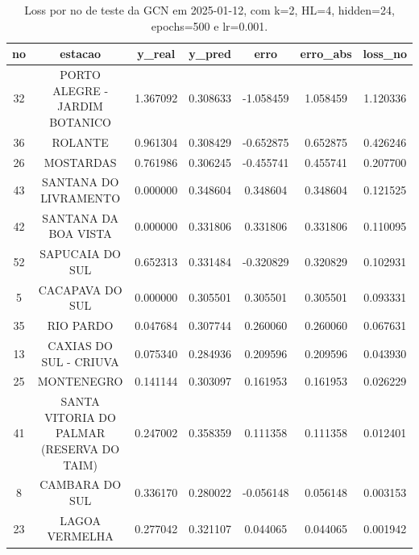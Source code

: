 \begin{table}[h]
\centering
\caption{Loss por no de teste da GCN em 2025-01-12, com k=2, HL=4, hidden=24, epochs=500 e lr=0.001.}
\label{tab:gcn_loss_k2_hl4_h24_e500_d20250112}
\begin{tabular}{ccccccc}
\toprule
no & estacao & y\_real & y\_pred & erro & erro\_abs & loss\_no \\
\midrule
32 & PORTO ALEGRE - JARDIM BOTANICO & 1.367092 & 0.308633 & -1.058459 & 1.058459 & 1.120336 \\
36 & ROLANTE & 0.961304 & 0.308429 & -0.652875 & 0.652875 & 0.426246 \\
26 & MOSTARDAS & 0.761986 & 0.306245 & -0.455741 & 0.455741 & 0.207700 \\
43 & SANTANA DO LIVRAMENTO & 0.000000 & 0.348604 & 0.348604 & 0.348604 & 0.121525 \\
42 & SANTANA DA BOA VISTA & 0.000000 & 0.331806 & 0.331806 & 0.331806 & 0.110095 \\
52 & SAPUCAIA DO SUL & 0.652313 & 0.331484 & -0.320829 & 0.320829 & 0.102931 \\
5 & CACAPAVA DO SUL & 0.000000 & 0.305501 & 0.305501 & 0.305501 & 0.093331 \\
35 & RIO PARDO & 0.047684 & 0.307744 & 0.260060 & 0.260060 & 0.067631 \\
13 & CAXIAS DO SUL - CRIUVA & 0.075340 & 0.284936 & 0.209596 & 0.209596 & 0.043930 \\
25 & MONTENEGRO & 0.141144 & 0.303097 & 0.161953 & 0.161953 & 0.026229 \\
41 & SANTA VITORIA DO PALMAR (RESERVA DO TAIM) & 0.247002 & 0.358359 & 0.111358 & 0.111358 & 0.012401 \\
8 & CAMBARA DO SUL & 0.336170 & 0.280022 & -0.056148 & 0.056148 & 0.003153 \\
23 & LAGOA VERMELHA & 0.277042 & 0.321107 & 0.044065 & 0.044065 & 0.001942 \\
\bottomrule
\end{tabular}
\end{table}
